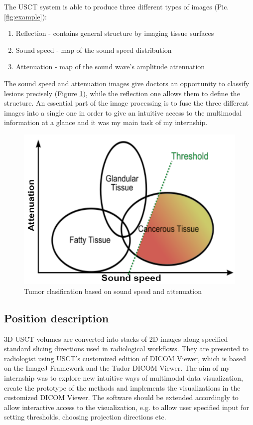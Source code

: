 \documentclass[english]{article}
\begin{document}
The USCT system is able to produce three different types of images (Pic. \ref{fig:example}):

\begin{enumerate}
\item Reflection - contains general structure by imaging tissue surfaces
\item Sound speed - map of the sound speed distribution
\item Attenuation - map of the sound wave's amplitude attenuation
\end{enumerate}

The sound speed and attenuation images give doctors an opportunity to classify lesions precisely  (Figure \ref{fig:nicol}), while the reflection one allows them to define the structure. An essential part of the image processing is to fuse the three different images into a single one in order to give an intuitive access to the multimodal information at a glance and it was my main task of my internship. 

\begin{figure}[H]
\centerline{\includegraphics[scale=0.5]{internship_report/nicol}}
\caption{Tumor clasification based on sound speed and attenuation\label{fig:nicol} \cite{nicol}}
\end{figure}
\subsection{Position description}

3D USCT volumes are converted into stacks of 2D images along specified standard slicing directions used in radiological workflows. They are presented to radiologist using USCT's customized edition of DICOM Viewer, which is based on the ImageJ Framework and the Tudor DICOM Viewer. The aim of my internship was to explore new intuitive ways of multimodal data visualization, create the prototype of the methods and implements the visualizations in the customized DICOM Viewer. The software should be extended accordingly to allow interactive access to the visualization, e.g. to allow user specified input for setting thresholds, choosing projection directions etc.\cite{p}\\
\end{document}
